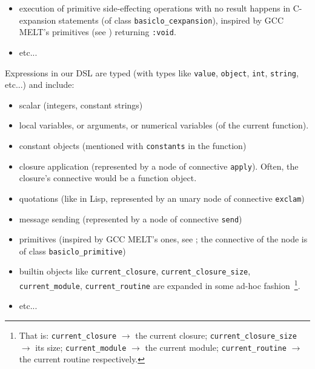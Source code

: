 \begin{itemize}
      \item execution of primitive side-effecting operations with no
        result happens in C-expansion statements (of class
          \texttt{basiclo\_cexpansion}), inspired by GCC MELT's
          primitives (see \cite{Starynkevitch-DSL2011}) returning
          \texttt{:void}.

      \item etc...
\end{itemize}

Expressions in our DSL are typed (with types like \texttt{value},
\texttt{object}, \texttt{int}, \texttt{string}, etc...)  and include:

\begin{itemize}
\item scalar (integers, constant strings)
  
\item local variables, or arguments, or numerical variables (of the current function).

\item constant objects (mentioned with \texttt{constants} in the function)

\item closure application (represented by a node of connective \texttt{apply}). Often, the closure's connective would be a
  function object.

  \item quotations (like in Lisp, represented by an unary node of
    connective \texttt{exclam})

\item message sending (represented by a node of connective \texttt{send})

\item primitives (inspired by GCC MELT's ones, see
  \cite{Starynkevitch-DSL2011}; the connective of the node is of class
  \texttt{basiclo\_primitive})

  \item builtin objects like \texttt{current\_closure},
    \texttt{current\_closure\_size}, \texttt{current\_module},
    \texttt{current\_routine} are expanded in some ad-hoc
    fashion~\footnote{That is: \texttt{current\_closure} $\rightarrow$
      the current closure; \texttt{current\_closure\_size}
      $\rightarrow$ its size; \texttt{current\_module} $\rightarrow$
      the current module; \texttt{current\_routine} $\rightarrow$ the
      current routine respectively.}.

\item etc...
  
\end{itemize}
  

